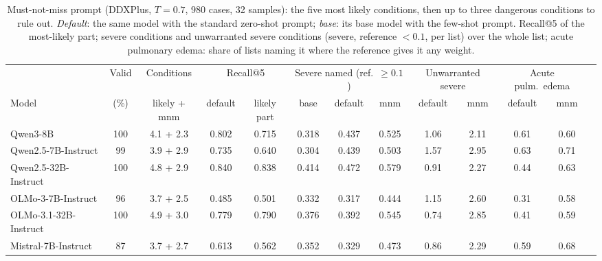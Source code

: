 \documentclass[11pt]{article}
\begin{document}
\begin{table}[t]
\centering\small
\begin{adjustbox}{max width=\linewidth}
\begin{tabular}{lcccccccccccc}
\toprule
 & Valid & Conditions & \multicolumn{2}{c}{Recall@5} & \multicolumn{3}{c}{Severe named (ref.\ $\geq 0.1$)} & \multicolumn{2}{c}{Unwarranted severe} & \multicolumn{2}{c}{Acute pulm.\ edema} \\
Model & (\%) & likely + mnm & default & likely part & base & default & mnm & default & mnm & default & mnm \\
\midrule
Qwen3-8B & 100 & 4.1 + 2.3 & 0.802 & 0.715 & 0.318 & 0.437 & 0.525 & 1.06 & 2.11 & 0.61 & 0.60 \\
Qwen2.5-7B-Instruct & 99 & 3.9 + 2.9 & 0.735 & 0.640 & 0.304 & 0.439 & 0.503 & 1.57 & 2.95 & 0.63 & 0.71 \\
Qwen2.5-32B-Instruct & 100 & 4.8 + 2.9 & 0.840 & 0.838 & 0.414 & 0.472 & 0.579 & 0.91 & 2.27 & 0.44 & 0.63 \\
OLMo-3-7B-Instruct & 96 & 3.7 + 2.5 & 0.485 & 0.501 & 0.332 & 0.317 & 0.444 & 1.15 & 2.60 & 0.31 & 0.58 \\
OLMo-3.1-32B-Instruct & 100 & 4.9 + 3.0 & 0.779 & 0.790 & 0.376 & 0.392 & 0.545 & 0.74 & 2.85 & 0.41 & 0.59 \\
Mistral-7B-Instruct & 87 & 3.7 + 2.7 & 0.613 & 0.562 & 0.352 & 0.329 & 0.473 & 0.86 & 2.29 & 0.59 & 0.68 \\
\bottomrule
\end{tabular}
\end{adjustbox}
\caption{Must-not-miss prompt (DDXPlus, $T{=}0.7$, 980 cases, 32 samples): the five most likely conditions, then up to three dangerous conditions to rule out. \emph{Default}: the same model with the standard zero-shot prompt; \emph{base}: its base model with the few-shot prompt. Recall@5 of the most-likely part; severe conditions and unwarranted severe conditions (severe, reference $< 0.1$, per list) over the whole list; acute pulmonary edema: share of lists naming it where the reference gives it any weight.}
\label{tab:mnm}
\end{table}
\end{document}
